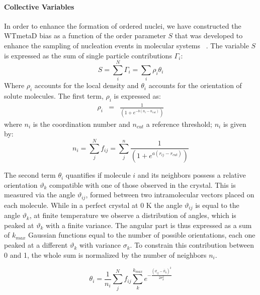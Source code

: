 \documentclass[journal=cgdefu,manuscript=article,layout=twocolumn]{achemso}
\begin{document}
\paragraph{Collective Variables} In order to enhance the formation of ordered nuclei, we have constructed the WTmetaD bias as a function of the order parameter $S$ that was developed to enhance the sampling of nucleation events in molecular systems ~\cite{giberti2015insight}. 
The variable $S$ is expressed as the sum of single particle contributions $\Gamma_i$: 
\begin{equation}
S = \sum_i^N \Gamma_i  = \sum_i \rho_i \theta_i
\end{equation}
Where $\rho_i$ accounts for the local density and $\theta_i$ accounts for the orientation of solute molecules. 
The first term, $\rho_i$ is expressed as: 
\begin{eqnarray}
\rho_i&=&\frac{1}{(1+e^{-b(n_{i}-n_{cut})})}   
\label{eq:1}
\end{eqnarray}
where $n_i$ is the coordination number and $n_{cut}$ a reference threshold; $n_i$ is given by: 
\begin{equation}
n_i = \sum_j^N f_{ij}= \sum_j^n\frac{1}{(1+e^{a(r_{ij}-r_{cut})})}
\label{eq:2}
\end{equation}

The second term $\theta_i$ quantifies if molecule $i$ and its neighbors possess a relative orientation $\vartheta_k$ compatible with one of those observed in the crystal. 
This is measured via the angle $\vartheta_{ij}$, formed between two intramolecular vectors placed on each molecule. 
While in a perfect crystal at 0 K the angle $\vartheta_{ij}$ is equal to the angle $\vartheta_k$, at finite temperature we observe a distribution of angles, which is peaked at $\vartheta_k$ with a finite variance. The angular part is thus expressed as a sum of  $k_{max}$ Gaussian functions equal to the number of possible orientations, each one peaked at a different $\vartheta_k$ with variance $\sigma_k$. To constrain this contribution between 0 and 1, the whole sum is normalized by the number of neighbors $n_i$.

\begin{equation}
\theta_{i}=\frac{1}{n_i} \sum_j^N f_{ij} \sum_k^{k_{max}}
e^{-\frac{(\vartheta_{ij}-\bar{\vartheta}_k)^2}{2\sigma_k^2}}
\end{equation}
\end{document}
